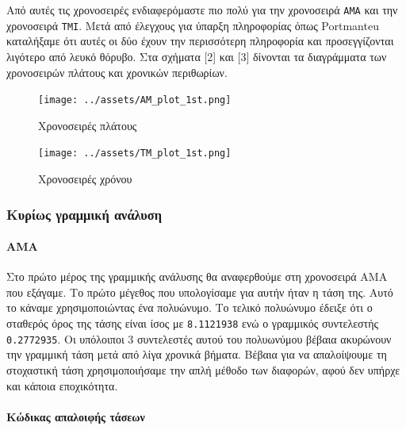 \documentclass[11pt,]{article}
\let\oldparagraph\paragraph
\renewcommand{\paragraph}[1]{\oldparagraph{#1}\mbox{}}
\begin{document}
Από αυτές τις χρονοσειρές ενδιαφερόμαστε πιο πολύ για την χρονοσειρά
\texttt{AMA} και την χρονοσειρά \texttt{TMI}. Μετά από έλεγχους για
ύπαρξη πληροφορίας όπως Portmanteu καταλήξαμε ότι αυτές οι δύο έχουν την
περισσότερη πληροφορία και προσεγγίζονται λιγότερο από λευκό θόρυβο. Στα
σχήματα {[}2{]} και {[}3{]} δίνονται τα διαγράμματα των χρονοσειρών
πλάτους και χρονικών περιθωρίων.

\begin{figure}
\centering
\texttt{[image: ../assets/AM\_plot\_1st.png]}
\caption{Χρονοσειρές πλάτους}
\end{figure}

\begin{figure}
\centering
\texttt{[image: ../assets/TM\_plot\_1st.png]}
\caption{Χρονοσειρές χρόνου}
\end{figure}

\hypertarget{ux3baux3c5ux3c1ux3afux3c9ux3c2-ux3b3ux3c1ux3b1ux3bcux3bcux3b9ux3baux3ae-ux3b1ux3bdux3acux3bbux3c5ux3c3ux3b7}{%
\subsubsection{Κυρίως γραμμική
ανάλυση}\label{ux3baux3c5ux3c1ux3afux3c9ux3c2-ux3b3ux3c1ux3b1ux3bcux3bcux3b9ux3baux3ae-ux3b1ux3bdux3acux3bbux3c5ux3c3ux3b7}}

\hypertarget{ama}{%
\paragraph{AMA}\label{ama}}

Στο πρώτο μέρος της γραμμικής ανάλυσης θα αναφερθούμε στη χρονοσειρά AMA
που εξάγαμε. Το πρώτο μέγεθος που υπολογίσαμε για αυτήν ήταν η τάση της.
Αυτό το κάναμε χρησιμοποιώντας ένα πολυώνυμο. Το τελικό πολυώνυμο έδειξε
ότι ο σταθερός όρος της τάσης είναι ίσος με \texttt{8.1121938} ενώ ο
γραμμικός συντελεστής \texttt{0.2772935}. Οι υπόλοιποι 3 συντελεστές
αυτού του πολυωνύμου βέβαια ακυρώνουν την γραμμική τάση μετά από λίγα
χρονικά βήματα. Βέβαια για να απαλοίψουμε τη στοχαστική τάση
χρησιμοποιήσαμε την απλή μέθοδο των διαφορών, αφού δεν υπήρχε και κάποια
εποχικότητα.

\hypertarget{ux3baux3ceux3b4ux3b9ux3baux3b1ux3c2-ux3b1ux3c0ux3b1ux3bbux3bfux3b9ux3c6ux3aeux3c2-ux3c4ux3acux3c3ux3b5ux3c9ux3bd}{%
\paragraph{Κώδικας απαλοιφής
τάσεων}\label{ux3baux3ceux3b4ux3b9ux3baux3b1ux3c2-ux3b1ux3c0ux3b1ux3bbux3bfux3b9ux3c6ux3aeux3c2-ux3c4ux3acux3c3ux3b5ux3c9ux3bd}}
\end{document}
